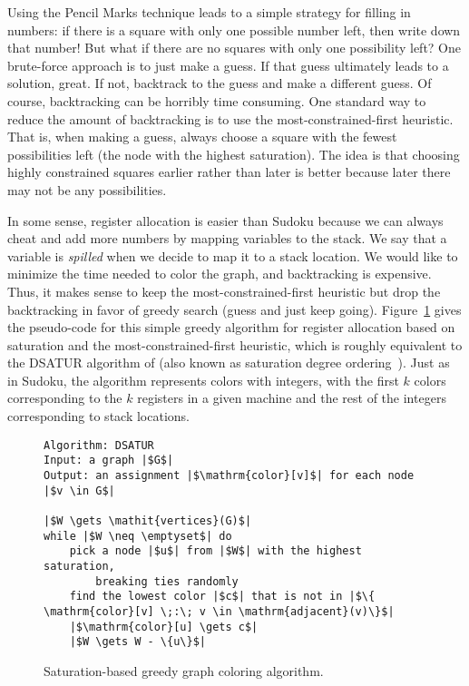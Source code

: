 \documentclass[11pt]{book}
\begin{document}
Using the Pencil Marks technique leads to a simple strategy for
filling in numbers: if there is a square with only one possible number
left, then write down that number! But what if there are no squares
with only one possibility left? One brute-force approach is to just
make a guess. If that guess ultimately leads to a solution, great.  If
not, backtrack to the guess and make a different guess.  Of course,
backtracking can be horribly time consuming. One standard way to
reduce the amount of backtracking is to use the most-constrained-first
heuristic. That is, when making a guess, always choose a square with
the fewest possibilities left (the node with the highest saturation).
The idea is that choosing highly constrained squares earlier rather
than later is better because later there may not be any possibilities.

In some sense, register allocation is easier than Sudoku because we
can always cheat and add more numbers by mapping variables to the
stack. We say that a variable is \emph{spilled} when we decide to map
it to a stack location. We would like to minimize the time needed to
color the graph, and backtracking is expensive. Thus, it makes sense
to keep the most-constrained-first heuristic but drop the backtracking
in favor of greedy search (guess and just keep going).
Figure~\ref{fig:satur-algo} gives the pseudo-code for this simple
greedy algorithm for register allocation based on saturation and the
most-constrained-first heuristic, which is roughly equivalent to the
DSATUR algorithm of \cite{Brelaz:1979eu} (also known as saturation
degree ordering~\citep{Gebremedhin:1999fk,Omari:2006uq}).  Just
as in Sudoku, the algorithm represents colors with integers, with the
first $k$ colors corresponding to the $k$ registers in a given machine
and the rest of the integers corresponding to stack locations.

\begin{figure}[btp]
  \centering
\begin{lstlisting}[basicstyle=\rmfamily,deletekeywords={for,from,with,is,not,in,find},morekeywords={while},columns=fullflexible]
Algorithm: DSATUR
Input: a graph |$G$|
Output: an assignment |$\mathrm{color}[v]$| for each node |$v \in G$|

|$W \gets \mathit{vertices}(G)$|
while |$W \neq \emptyset$| do
    pick a node |$u$| from |$W$| with the highest saturation,
        breaking ties randomly
    find the lowest color |$c$| that is not in |$\{ \mathrm{color}[v] \;:\; v \in \mathrm{adjacent}(v)\}$|
    |$\mathrm{color}[u] \gets c$|
    |$W \gets W - \{u\}$|
\end{lstlisting}
  \caption{Saturation-based greedy graph coloring algorithm.}
  \label{fig:satur-algo}
\end{figure}
\end{document}
